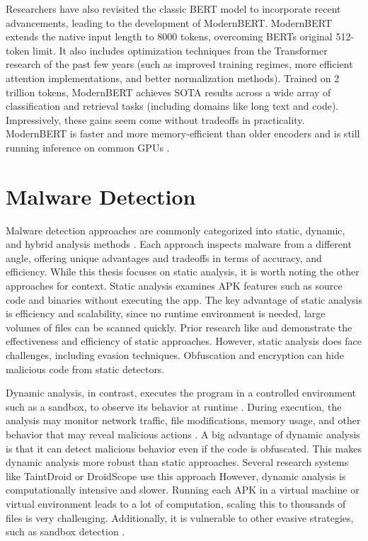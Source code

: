 Researchers have also revisited the classic BERT model to incorporate recent advancements, 
leading to the development of ModernBERT.
ModernBERT extends the native input length to 8000 tokens, overcoming BERTs original 512-token limit. 
It also includes optimization techniques from the Transformer research of the past few years 
(such as improved training regimes, more efficient attention implementations, 
and better normalization methods). 
Trained on 2 trillion tokens, ModernBERT achieves SOTA results across a wide array of 
classification and retrieval tasks (including domains like long text and code). 
Impressively, these gains seem come without tradeoffs in practicality.
ModernBERT is faster and more memory-efficient than older encoders and is still 
running inference on common GPUs \cite{modernbert}.

\section{Malware Detection}

Malware detection approaches are commonly categorized into static, dynamic, and hybrid analysis methods \cite{vorlesung}.
Each approach inspects malware from a different angle, 
offering unique advantages and tradeoffs in terms of accuracy, and efficiency.
While this thesis focuses on static analysis, it is worth noting the other approaches for context.
Static analysis examines APK features such as source code and binaries without executing the app.
The key advantage of static analysis is efficiency and scalability, 
since no runtime environment is needed, large volumes of files can be scanned quickly.
Prior research like \cite{drebin} and \cite{detectbert} demonstrate the effectiveness and efficiency of static approaches.
However, static analysis does face challenges, including evasion techniques.
Obfuscation and encryption can hide malicious code from static detectors.

Dynamic analysis, in contrast, executes the program in a controlled environment 
such as a sandbox\cite{sandbox}, to observe its behavior at runtime \cite{vorlesung}.
During execution, the analysis may monitor network traffic, file modifications, memory usage, 
and other behavior that may reveal malicious actions \cite{stateoftheartaibasedmalwaredetection}. 
A big advantage of dynamic analysis is that it can detect malicious behavior even if the code is obfuscated. 
This makes dynamic analysis more robust than static approaches.
Several research systems like TaintDroid \cite{taintdroid} or DroidScope \cite{droidscope} 
use this approach
However, dynamic analysis is computationally intensive and slower.
Running each APK in a virtual machine or virtual environment leads to a lot of computation, 
scaling this to thousands of files is very challenging.
Additionally, it is vulnerable to other evasive strategies, such as sandbox detection \cite{sandbox_detection}.

